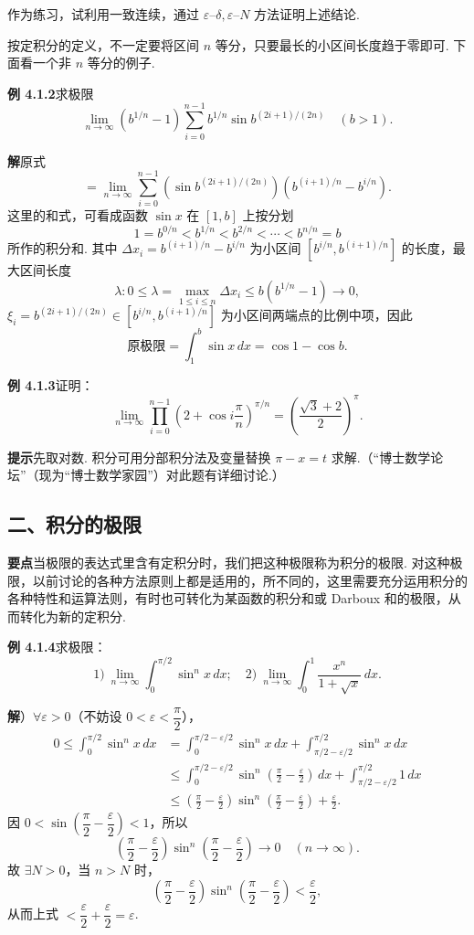 \documentclass[UTF8, 12pt, fontset=fandol, oneside]{ctexart}
\begin{document}
作为练习，试利用一致连续，通过 $\varepsilon$--$\delta,\varepsilon$--$N$ 方法证明上述结论.

按定积分的定义，不一定要将区间 $n$ 等分，只要最长的小区间长度趋于零即可. 下面看一个非 $n$ 等分的例子.

\noindent\textbf{例 4.1.2}\quad 求极限
\[
\lim_{n\to\infty}\left(b^{1/n}-1\right)
\sum_{i=0}^{n-1} b^{1/n}\sin b^{(2i+1)/(2n)}
\quad(b>1).
\]

\noindent\textbf{解}\quad 原式
\[
=\lim_{n\to\infty}\sum_{i=0}^{n-1}
\left(\sin b^{(2i+1)/(2n)}\right)
\left(b^{(i+1)/n}-b^{i/n}\right).
\]
这里的和式，可看成函数 $\sin x$ 在 $[1,b]$ 上按分划
\[
1=b^{0/n}<b^{1/n}<b^{2/n}<\cdots<b^{n/n}=b
\]
所作的积分和. 其中 $\Delta x_i=b^{(i+1)/n}-b^{i/n}$ 为小区间
$[b^{i/n},b^{(i+1)/n}]$ 的长度，最大区间长度
\[
\lambda:0\le\lambda=\max_{1\le i\le n}\Delta x_i\le b\left(b^{1/n}-1\right)\to0,
\]
$\xi_i=b^{(2i+1)/(2n)}\in[b^{i/n},b^{(i+1)/n}]$ 为小区间两端点的比例中项，因此
\[
\text{原极限}=\int_1^b\sin x\,dx=\cos1-\cos b.
\]

\noindent\textbf{例 4.1.3}\quad 证明：
\[
\lim_{n\to\infty}\prod_{i=0}^{n-1}\left(2+\cos i\frac\pi n\right)^{\pi/n}
=\left(\frac{\sqrt3+2}{2}\right)^\pi.
\]

\noindent\textbf{提示}\quad 先取对数. 积分可用分部积分法及变量替换 $\pi-x=t$ 求解.（“博士数学论坛”（现为“博士数学家园”）对此题有详细讨论.）

\subsection*{二、积分的极限}

\noindent\textbf{要点}\quad 当极限的表达式里含有定积分时，我们把这种极限称为积分的极限. 对这种极限，以前讨论的各种方法原则上都是适用的，所不同的，这里需要充分运用积分的各种特性和运算法则，有时也可转化为某函数的积分和或 Darboux 和的极限，从而转化为新的定积分.

\noindent\textbf{例 4.1.4}\quad 求极限：
\[
1)\ \lim_{n\to\infty}\int_0^{\pi/2}\sin^n x\,dx;\quad
2)\ \lim_{n\to\infty}\int_0^1\frac{x^n}{1+\sqrt{x}}\,dx.
\]

\noindent\textbf{解}）$\forall\varepsilon>0$（不妨设 $0<\varepsilon<\dfrac\pi2$），
\[
\begin{aligned}
0\le\int_0^{\pi/2}\sin^n x\,dx
&=\int_0^{\pi/2-\varepsilon/2}\sin^n x\,dx
+\int_{\pi/2-\varepsilon/2}^{\pi/2}\sin^n x\,dx\\
&\le\int_0^{\pi/2-\varepsilon/2}
\sin^n\left(\frac\pi2-\frac\varepsilon2\right)\,dx
+\int_{\pi/2-\varepsilon/2}^{\pi/2}1\,dx\\
&\le\left(\frac\pi2-\frac\varepsilon2\right)
\sin^n\left(\frac\pi2-\frac\varepsilon2\right)+\frac\varepsilon2.
\end{aligned}
\]
因 $0<\sin\left(\dfrac\pi2-\dfrac\varepsilon2\right)<1$，所以
\[
\left(\frac\pi2-\frac\varepsilon2\right)
\sin^n\left(\frac\pi2-\frac\varepsilon2\right)\to0\quad(n\to\infty).
\]
故 $\exists N>0$，当 $n>N$ 时，
\[
\left(\frac\pi2-\frac\varepsilon2\right)
\sin^n\left(\frac\pi2-\frac\varepsilon2\right)<\frac\varepsilon2,
\]
从而上式 $<\dfrac\varepsilon2+\dfrac\varepsilon2=\varepsilon$.
\end{document}

